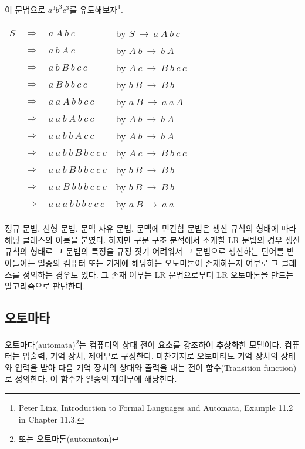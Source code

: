 \documentclass[a4paper]{book}
\begin{document}
이 문법으로 $a^3 b^3 c^3$를 유도해보자\footnote{Peter Linz, Introduction to Formal Languages and Automata, Example 11.2 in Chapter 11.3.}.

\begin{center}
  \begin{tabular}{r c l l }
    $S$
      & $\Rightarrow$ & $a \ A \ b \ c$  & by $S \ \rightarrow \ a \ A \ b \ c$ \\
      & $\Rightarrow$ & $a \ b \ A \ c$ & by $A \ b \ \rightarrow \ b \ A$ \\
      & $\Rightarrow$ & $a \ b \ B \ b \ c \ c$ & by $A \ c \ \rightarrow \ B \ b \ c \ c$ \\
      & $\Rightarrow$ & $a \ B \ b \ b \ c \ c$ & by $b \ B \ \rightarrow \ B \ b$ \\
      & $\Rightarrow$ & $a \ a \ A \ b \ b \ c \ c$ & by $a \ B \ \rightarrow \ a \ a \ A$ \\
      & $\Rightarrow$ & $a \ a \ b \ A \ b \ c \ c$ & by $A \ b \ \rightarrow \ b \ A$ \\
      & $\Rightarrow$ & $a \ a \ b \ b \ A \ c \ c$ & by $A \ b \ \rightarrow \ b \ A$ \\
      & $\Rightarrow$ & $a \ a \ b \ b \ B \ b \ c \ c \ c$ & by $A \ c \ \rightarrow \ B \ b \ c \ c$ \\
      & $\Rightarrow$ & $a \ a \ b \ B \ b \ b \ c \ c \ c$ & by $b \ B \ \rightarrow \ B \ b$ \\
      & $\Rightarrow$ & $a \ a \ B \ b \ b \ b \ c \ c \ c$ & by $b \ B \ \rightarrow \ B \ b$ \\
      & $\Rightarrow$ & $a \ a \ a \ b \ b \ b \ c \ c \ c$ & by $a \ B \ \rightarrow \ a \ a$
  \end{tabular}
\end{center}

정규 문법, 선형 문법, 문맥 자유 문법, 문맥에 민간함 문법은 생산 규칙의
형태에 따라 해당 클래스의 이름을 붙였다.  하지만 구문 구조 분석에서
소개할 LR 문법의 경우 생산 규칙의 형태로 그 문법의 특징을 규정 짓기
어려워서 그 문법으로 생산하는 단어를 받아들이는 일종의 컴퓨터 또는
기계에 해당하는 오토마톤이 존재하는지 여부로 그 클래스를 정의하는
경우도 있다. 그 존재 여부는 LR 문법으로부터 LR 오토마톤을 만드는
알고리즘으로 판단한다.


\subsection{오토마타}
\label{subsec:automata}

오토마타(automata)\footnote{또는 오토마톤(automaton)}는 컴퓨터의 상태
전이 요소를 강조하여 추상화한 모델이다. 컴퓨터는 입출력, 기억 장치,
제어부로 구성한다. 마찬가지로 오토마타도 기억 장치의 상태와 입력을
받아 다음 기억 장치의 상태와 출력을 내는 전이 함수(Transition
function)로 정의한다. 이 함수가 일종의 제어부에 해당한다.
\end{document}
